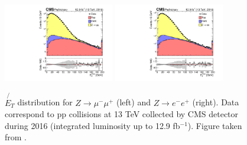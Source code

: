 \begin{figure}[ht]
  \begin{center}
    \includegraphics[width=0.43\textwidth]{figuras/Chapter3/METPerformancemumu.pdf}
    \includegraphics[width=0.43\textwidth]{figuras/Chapter3/METPerformanceee.pdf}
    \caption{$\not{E_{T}}$ distribution for $Z\rightarrow \mu^{-}\mu^{+}$ (left) and $Z\rightarrow e^{-}e^{+}$ (right). Data 
    correspond to pp collisions at 13 TeV collected by CMS detector during 2016 (integrated luminosity up to 12.9 fb$^{-1}$).
    Figure taken from \cite{CMS-PAS-JME-16-004}.}
    \label{fig:MetPerfomance}
  \end{center}
\end{figure} 








